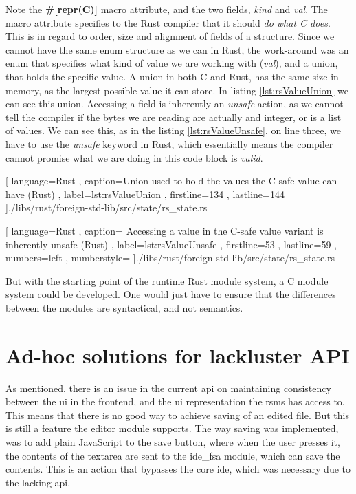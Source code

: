 Note the \textbf{\#[repr(C)]} macro attribute, and the two fields,
\textit{kind} and \textit{val}. The macro attribute specifies to the Rust
compiler that it should \textit{do what C does}. This is in regard to order,
size and alignment of fields of a structure. Since we cannot have the same enum
structure as we can in Rust, the work-around was an enum that specifies what
kind of value we are working with (\textit{val}), and a union, that holds the
specific value. A union in both C and Rust, has the same size in memory, as the
largest possible value it can store. In listing \ref{lst:rsValueUnion} we can
see this union. Accessing a field is inherently an \textit{unsafe} action, as we
cannot tell the compiler if the bytes we are reading are actually and integer,
or is a list of values. We can see this, as in the listing
\ref{lst:rsValueUnsafe}, on line three, we have to use the \textit{unsafe}
keyword in Rust, which essentially means the compiler cannot promise what we are
doing in this code block is \textit{valid}.

\begin{code}
  
    [ language=Rust
    , caption={Union used to hold the values the C-safe value can have (Rust)}
    , label=lst:rsValueUnion
    , firstline=134
    , lastline=144
    ]{./libs/rust/foreign-std-lib/src/state/rs\_state.rs}
\end{code}

\begin{code}
  
    [ language=Rust
    , caption={
      Accessing a value in the C-safe value variant is inherently unsafe (Rust)
    }
    , label=lst:rsValueUnsafe
    , firstline=53
    , lastline=59
    , numbers=left
    , numberstyle=\tiny\color{gray}
    ]{./libs/rust/foreign-std-lib/src/state/rs\_state.rs}
\end{code}

But with the starting point of the runtime Rust module system, a C module system
could be developed. One would just have to ensure that the differences between
the modules are syntactical, and not semantics.


\section{Ad-hoc solutions for lackluster API} \label{sec:lackluster}

As mentioned, there is an issue in the current \gls*{api} on maintaining
consistency between the \gls*{ui} in the frontend, and the \gls*{ui}
representation the \gls*{rsms} has access to. This means that there is no
good way to achieve saving of an edited file. But this is still a feature the
editor module supports. The way saving was implemented, was to add plain
JavaScript to the save button, where when the user presses it, the contents
of the textarea are sent to the \gls*{ide}\_fsa module, which can save the
contents. This is an action that bypasses the core \gls*{ide}, which was
necessary due to the lacking \gls*{api}.


